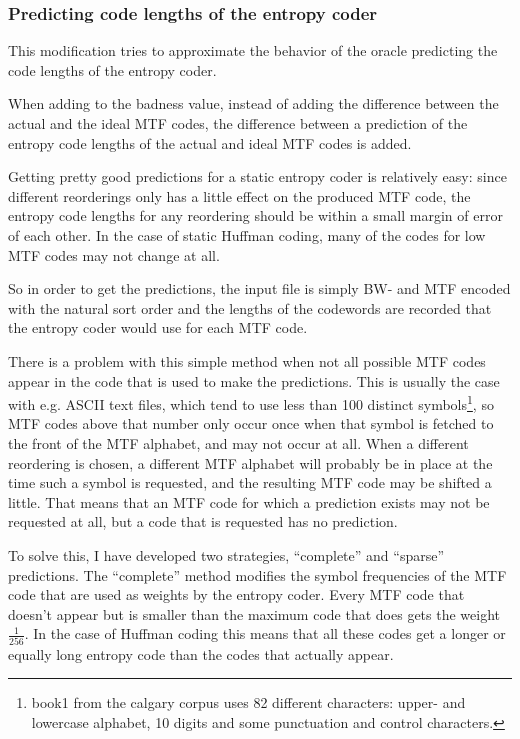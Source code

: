 \documentclass[a4paper]{scrreprt}
\begin{document}
\subsubsection{Predicting code lengths of the entropy coder}

This modification tries to approximate the behavior of the oracle predicting the
code lengths of the entropy coder.

When adding to the badness value, instead of adding the difference between the
actual and the ideal MTF codes, the difference between a prediction of the
entropy code lengths of the actual and ideal MTF codes is added.

Getting pretty good predictions for a static entropy coder is relatively easy:
since different reorderings only has a little effect on the produced MTF code,
the entropy code lengths for any reordering should be within a small margin of
error of each other. In the case of static Huffman coding, many of the codes for
low MTF codes may not change at all.

So in order to get the predictions, the input file is simply BW- and MTF encoded
with the natural sort order and the lengths of the codewords are recorded that
the entropy coder would use for each MTF code.

There is a problem with this simple method when not all possible MTF codes
appear in the code that is used to make the predictions. This is usually the
case with e.g. ASCII text files, which tend to use less than 100 distinct
symbols\footnote{book1 from the calgary corpus uses 82 different characters:
upper- and lowercase alphabet, 10 digits and some punctuation and control
characters.}, so MTF codes above that number only occur once when that symbol is
fetched to the front of the MTF alphabet, and may not occur at all.
When a different reordering is chosen, a different MTF alphabet will probably be
in place at the time such a symbol is requested, and the resulting MTF code may
be shifted a little. That means that an MTF code for which a prediction exists
may not be requested at all, but a code that is requested has no prediction.

To solve this, I have developed two strategies, ``complete'' and ``sparse''
predictions.
The ``complete'' method modifies the symbol frequencies of the MTF code that are
used as weights by the entropy coder. Every MTF code that doesn't appear but is
smaller than the maximum code that does gets the weight \(\frac{1}{256}\). In
the case of Huffman coding this means that all these codes get a longer or
equally long entropy code than the codes that actually appear.
\end{document}
